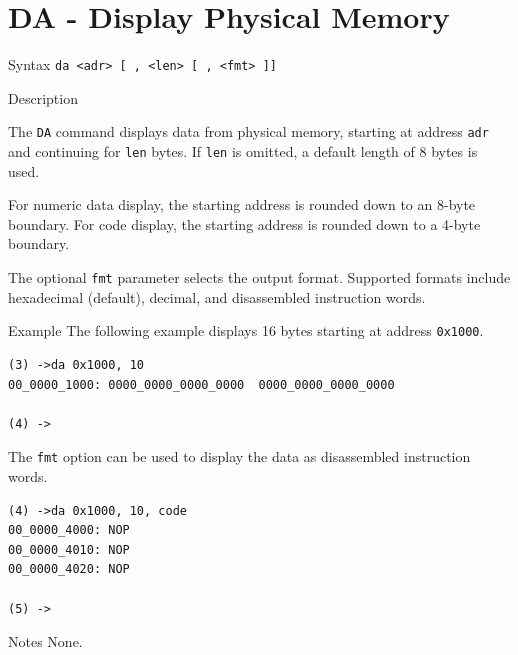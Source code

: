 %
%
\pagebreak
\section*{DA - Display Physical Memory}

\begin{iPageDescEntry}{Syntax}
\texttt{da <adr> [ , <len> [ , <fmt> ]]}
\end{iPageDescEntry}

\begin{iPageDescEntry}{Description}

The \texttt{DA} command displays data from physical memory, starting at address
\texttt{adr} and continuing for \texttt{len} bytes. If \texttt{len} is omitted,
a default length of 8 bytes is used.

For numeric data display, the starting address is rounded down to an 8-byte
boundary. For code display, the starting address is rounded down to a 4-byte
boundary.

The optional \texttt{fmt} parameter selects the output format. Supported formats
include hexadecimal (default), decimal, and disassembled instruction words.

\end{iPageDescEntry}

\begin{iPageDescEntry}{Example}
The following example displays 16 bytes starting at address \texttt{0x1000}.

\begin{lstlisting}[style=iPageOpStyle]
(3) ->da 0x1000, 10 
00_0000_1000: 0000_0000_0000_0000  0000_0000_0000_0000

(4) ->   
\end{lstlisting}

The \texttt{fmt} option can be used to display the data as disassembled
instruction words.

\begin{lstlisting}[style=iPageOpStyle]
(4) ->da 0x1000, 10, code
00_0000_4000: NOP
00_0000_4010: NOP
00_0000_4020: NOP

(5) ->
\end{lstlisting}

\end{iPageDescEntry}

\begin{iPageDescEntry}{Notes}
None.
\end{iPageDescEntry}
